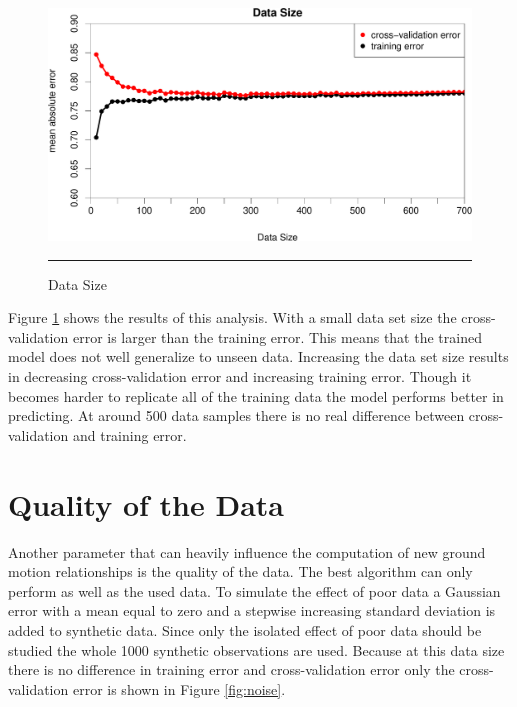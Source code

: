 \begin{figure}[!htpb]
	\centering
		\includegraphics[scale=0.33]{Figures/numberData.pdf}
		\rule{35em}{0.5pt}
	\caption[Data Size]{Data Size}
	\label{fig:data}
\end{figure}

Figure \ref{fig:data} shows the results of this analysis. With a small data set size the cross-validation error is larger than the training error. This means that the trained model does not well generalize to unseen data. Increasing the data set size results in decreasing cross-validation error and increasing training error. Though it becomes harder to replicate all of the training data the model performs better in predicting. At around 500 data samples there is no real difference between cross-validation and training error. 

\section{Quality of the Data}
Another parameter that can heavily influence the computation of new ground motion relationships is the quality of the data. The best algorithm can only perform as well as the used data. To simulate the effect of poor data a Gaussian error with a mean equal to zero and a stepwise increasing standard deviation is added to synthetic data. Since only the isolated effect of poor data should be studied the whole 1000 synthetic observations are used. Because at this data size there is no difference in training error and cross-validation error only the cross-validation error is shown in Figure \ref{fig:noise}.

